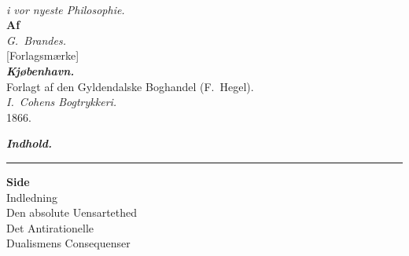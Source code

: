 
\begin{center}
\\[10pt]
\emph{i vor nyeste Philosophie.}\\[14pt]
\textbf{Af}\\[10pt]
\emph{G.\ Brandes.}\\[16pt]
[Forlagsmærke]\\[16pt]
\emph{\textbf{Kjøbenhavn.}}\\[4pt]
Forlagt af den Gyldendalske Boghandel (F.\ Hegel).\\[4pt]
{\small\emph{I.\ Cohens Bogtrykkeri.}}\\[6pt]
1866.
\end{center}


\begin{center}
\emph{\textbf{Indhold.}}\\[4pt]
\rule{1.5cm}{0.4pt}
\end{center}

\begin{flushleft}
\hfill\textbf{Side}\\[2pt]
Indledning \\
Den absolute Uensartethed \\
Det Antirationelle \\
Dualismens Consequenser 
\end{flushleft}

